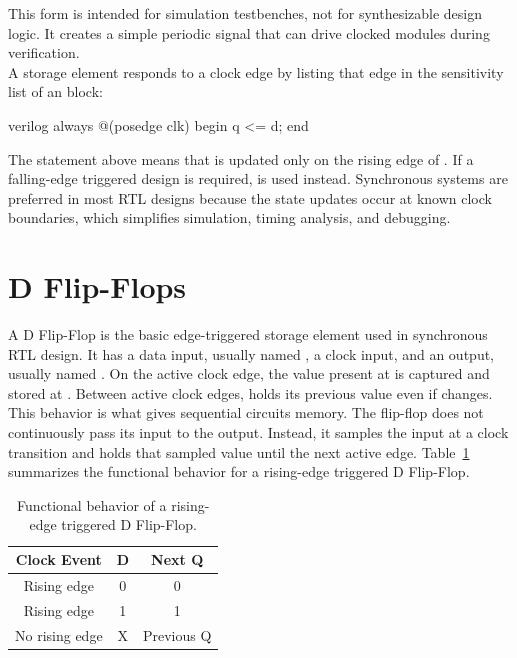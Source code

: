 \noindent This form is intended for simulation testbenches, not for synthesizable design logic. It
creates a simple periodic signal that can drive clocked modules during verification.\\

\noindent A storage element responds to a clock edge by listing that edge in the sensitivity list of
an  block:

\begin{codeblock}{verilog}
always @(posedge clk) begin
    q <= d;
end
\end{codeblock}

\noindent The statement above means that  is updated only on the rising edge of
. If a falling-edge triggered design is required,  is used
instead. Synchronous systems are preferred in most RTL designs because the state updates occur at
known clock boundaries, which simplifies simulation, timing analysis, and debugging.

\section{D Flip-Flops}
A D Flip-Flop is the basic edge-triggered storage element used in synchronous RTL design. It has a
data input, usually named , a clock input, and an output, usually named
. On the active clock edge, the value present at  is captured and stored
at . Between active clock edges,  holds its previous value even if
 changes.\\

\noindent This behavior is what gives sequential circuits memory. The flip-flop does not
continuously pass its input to the output. Instead, it samples the input at a clock transition and
holds that sampled value until the next active edge. Table~\ref{tab:dff_function} summarizes the
functional behavior for a rising-edge triggered D Flip-Flop.

\begin{table}[H]
\centering
\renewcommand{\arraystretch}{1.2}
\begin{tabular}{|c|c|c|}
\hline
\textbf{Clock Event} & \textbf{D} & \textbf{Next Q} \\
\hline
Rising edge & 0 & 0 \\
\hline
Rising edge & 1 & 1 \\
\hline
No rising edge & X & Previous Q \\
\hline
\end{tabular}
\caption{Functional behavior of a rising-edge triggered D Flip-Flop.}
\label{tab:dff_function}
\end{table}

